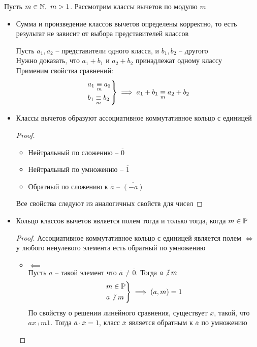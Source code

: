 \begin{theorem}
	Пусть $m \in \mathbb{N}, ~ m > 1 $. Рассмотрим классы вычетов по модулю $m$
	\begin{itemize}
		\item Сумма и произведение классов вычетов определены корректно, то есть результат не зависит от выбора представителей классов
		\begin{replacementproof}
			Пусть $a_1, a_2$ -- представители одного класса, и $b_1, b_2$ -- другого \\
			Нужно доказать, что $a_1 + b_1$ и $a_2 + b_2$ принадлежат одному классу \\
			Применим свойства сравнений:
			$$ \begin{rcases}
				a_1 \underset{m}{\equiv} a_2 \\
				b_1 \underset{m}{\equiv} b_2
			\end{rcases} \implies a_1 + b_1 \underset{m}{\equiv} a_2 + b_2 $$
		\end{replacementproof}
		\item Классы вычетов образуют ассоциативное коммутативное кольцо с единицей
		\begin{proof}
			\hfill
			\begin{itemize}
				\item Нейтральный по сложению -- $\overline{0}$
				\item Нейтральный по умножению -- $\overline{1}$
				\item Обратный по сложению к $\overline{a}$ -- $\overline{(-a)}$
			\end{itemize}
			Все свойства следуют из аналогичных свойств для чисел
		\end{proof}
		\item Кольцо классов вычетов является полем тогда и только тогда, когда $m \in \mathbb{P}$
		\begin{proof}
			Ассоциативное коммутативное кольцо с единицей является полем $\iff$ у любого ненулевого элемента есть обратный по умножению
			\begin{itemize}
				\item $\impliedby$ \\
				Пусть $a$ -- такой элемент что $\overline{a} \ne \overline{0}$. Тогда $a \ndivby m $
				$$ \begin{rcases}
				   	m \in \Prime \\
					a \ndivby m
				   \end{rcases} \implies (a, m) = 1 $$
				По свойству о решении линейного сравнения, существует $x$, такой, что $ax \comp{m} 1$. Тогда $\overline{a} \cdot \overline{x} = 1 $, класс $\overline{x}$ является обратным к $\overline{a}$ по умножению

\end{itemize}
\end{proof}
\end{itemize}
\end{theorem}
